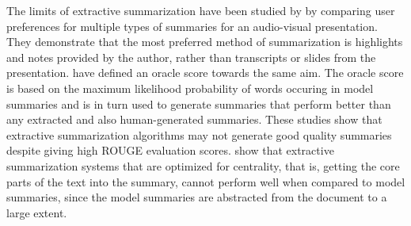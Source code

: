 The limits of extractive summarization have been studied by  by comparing user preferences for multiple types of summaries for an audio-visual presentation. They demonstrate that the most preferred method of summarization is highlights and notes provided by the author, rather than transcripts or slides from the presentation.  have defined an oracle score towards the same aim. The oracle score is based on the maximum likelihood probability of words occuring in model summaries and is in turn used to generate summaries that perform better than any extracted and also human-generated summaries. These studies show that extractive summarization algorithms may not generate good quality summaries despite giving high ROUGE evaluation scores.  show that extractive summarization systems that are optimized for centrality, that is, getting the core parts of the text into the summary, cannot perform well when compared to model summaries, since the model summaries are abstracted from the document to a large extent.

